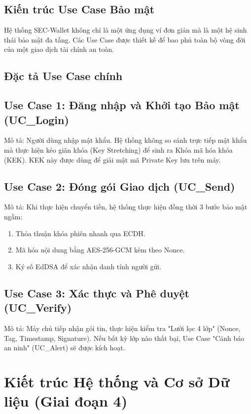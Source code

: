 \documentclass[11pt,a4paper]{article}
\begin{document}
\subsection{Kiến trúc Use Case Bảo mật}
Hệ thống SEC-Wallet không chỉ là một ứng dụng ví đơn giản mà là một hệ sinh thái bảo mật đa tầng. Các Use Case được thiết kế để bao phủ toàn bộ vòng đời của một giao dịch tài chính an toàn.

\subsection{Đặc tả Use Case chính}
\subsection{Use Case 1: Đăng nhập và Khởi tạo Bảo mật (UC\_Login)}
Mô tả: Người dùng nhập mật khẩu. Hệ thống không so sánh trực tiếp mật khẩu mà thực hiện kéo giãn khóa (Key Stretching) để sinh ra Khóa mã hóa khóa (KEK). KEK này được dùng để giải mật mã Private Key lưu trên máy.

\subsection{Use Case 2: Đóng gói Giao dịch (UC\_Send)}
Mô tả: Khi thực hiện chuyển tiền, hệ thống thực hiện đồng thời 3 bước bảo mật ngầm:
\begin{enumerate}
    \item Thỏa thuận khóa phiên nhanh qua ECDH.
    \item Mã hóa nội dung bằng AES-256-GCM kèm theo Nonce.
    \item Ký số EdDSA để xác nhận danh tính người gửi.
\end{enumerate}

\subsection{Use Case 3: Xác thực và Phê duyệt (UC\_Verify)}
Mô tả: Máy chủ tiếp nhận gói tin, thực hiện kiểm tra "Lưới lọc 4 lớp" (Nonce, Tag, Timestamp, Signature). Nếu bất kỳ lớp nào thất bại, Use Case "Cảnh báo an ninh" (UC\_Alert) sẽ được kích hoạt.

\section{Kiết trúc Hệ thống và Cơ sở Dữ liệu (Giai đoạn 4)}
\end{document}
